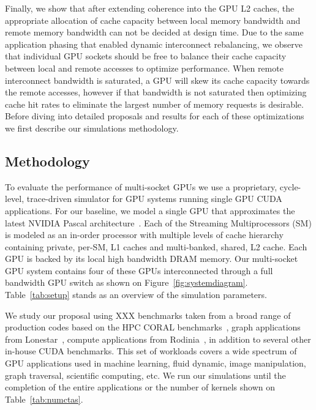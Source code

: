 Finally, we show that after extending coherence into the GPU L2 caches, the 
appropriate allocation of cache capacity between local memory bandwidth and 
remote memory bandwidth can not be decided at design time.  Due to the same 
application phasing that enabled dynamic interconnect rebalancing, we observe 
that individual GPU sockets should be free to balance their cache capacity 
between local and remote accesses to optimize performance.  When remote 
interconnect bandwidth is saturated, a GPU will skew its cache capacity towards 
the remote accesses,  however if that bandwidth is not saturated then optimizing 
cache hit rates to eliminate the largest number of memory requests is 
desirable. Before diving into detailed proposals and results for each of these 
optimizations we first describe our simulations methodology.


\subsection{Methodology}
\label{methodology}
 To evaluate the performance of multi-socket GPUs we use a proprietary, 
cycle-level, trace-driven simulator for GPU systems running single GPU CUDA 
applications. For our baseline, we model a single GPU that approximates the 
latest NVIDIA Pascal architecture~\cite{inside-pascal}. Each of the Streaming 
Multiprocessors (SM) is modeled as an in-order processor with multiple levels of cache hierarchy 
containing private, per-SM, L1 caches and multi-banked, shared, L2 cache. Each 
GPU is backed by its local high bandwidth DRAM memory. Our multi-socket GPU 
system contains four of these GPUs interconnected through a full bandwidth GPU 
switch as shown on Figure~\ref{fig:systemdiagram}. Table~\ref{tab:setup} stands as an overview of the simulation parameters.

We study our proposal using XXX benchmarks taken from a broad range of 
production codes based on the HPC CORAL benchmarks~\cite{coral}, graph 
applications from Lonestar~\cite{lonestar}, compute applications from 
Rodinia~\cite{Che2009}, in addition to several other in-house CUDA benchmarks. 
This set of workloads covers a wide spectrum of GPU applications used in machine 
learning, fluid dynamic, image manipulation, graph traversal, scientific 
computing, etc. We run our simulations until the completion of the entire 
applications or the number of kernels shown on Table~\ref{tab:numctas}.

